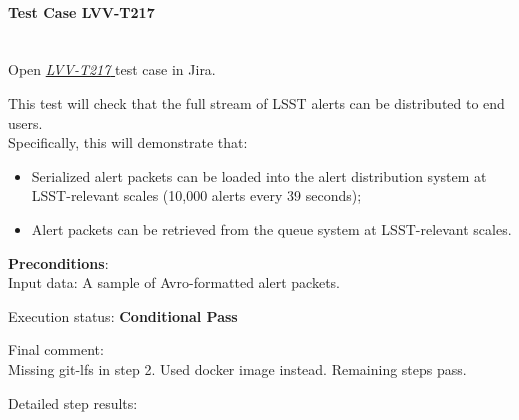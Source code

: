 \documentclass[DM,lsstdraft,STR,toc]{lsstdoc}
\providecommand{\tightlist}{
  \setlength{\itemsep}{0pt}\setlength{\parskip}{0pt}}
\begin{document}
    \paragraph{Test Case LVV-T217 }\mbox{}\\

Open  \href{https://jira.lsstcorp.org/secure/Tests.jspa#/testCase/LVV-T217}{\textit{ LVV-T217 } }
test case in Jira.

    This test will check that the full stream of LSST alerts can be
distributed to end users.\\[2\baselineskip]Specifically, this will
demonstrate that:

\begin{itemize}
\tightlist
\item
  Serialized alert packets can be loaded into the alert distribution
  system at LSST-relevant scales (10,000 alerts every 39 seconds);
\item
  Alert packets can be retrieved from the queue system at LSST-relevant
  scales.
\end{itemize}


    {\bf Preconditions}:\\
    Input data: A sample of Avro-formatted alert packets.


    Execution status: {\bf Conditional Pass }

    Final comment:\\Missing git-lfs in step 2. Used docker image instead. Remaining steps
pass.



    Detailed step results:
\end{document}

